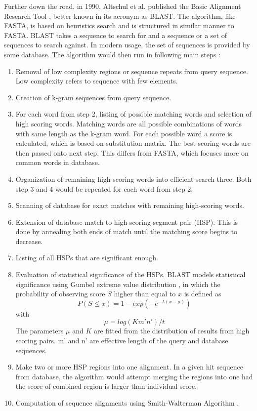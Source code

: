 Further down the road, in 1990, Altschul et al. published the Basic Alignment Research Tool \citep{Altschul90}, better known in its acronym as BLAST. The algorithm, like FASTA, is based on heuristics search and is structured in similar manner to FASTA. BLAST takes a sequence to search for and a sequence or a set of sequences to search against. In modern usage, the set of sequences is provided by some database. The algorithm would then run in following main steps \citep{mount2001bioinformatics}:

\begin{enumerate}
\item Removal of low complexity regions or sequence repeats from query sequence. Low complexity refers to sequence with few elements.
\item Creation of k-gram sequences from query sequence.
\item For each word from step 2, listing of possible matching words and selection of high scoring words. Matching words are all possible combinations of words with same length as the k-gram word. For each possible word a score is calculated, which is based on substitution matrix. The best scoring words are then passed onto next step. This differs from FASTA, which focuses more on common words in database.
\item Organization of remaining high scoring words into efficient search three. Both step 3 and 4 would be repeated for each word from step 2.
\item Scanning of database for exact matches with remaining high-scoring words.
\item Extension of database match to high-scoring-segment pair (HSP). This is done by annealing both ends of match until the matching score begins to decrease.
\item Listing of all HSPs that are significant enough.
\item Evaluation of statistical significance of the HSPs. BLAST models statistical significance using Gumbel extreme value distribution \citep{gumbel1954statistical}, in which the probability of observing score $S$ higher than equal to $x$ is defined as $$P(S \leq x) = 1 - exp(-e^{- \lambda (x - \mu)})$$ with $$\mu = log(Km'n')/t$$ The parameters $\mu$ and $K$ are fitted from the distribution of results from high scoring pairs. m' and n' are effective length of the query and database sequences.
\item Make two or more HSP regions into one alignment. In a given hit sequence from database, the algorithm would attempt merging the regions into one had the score of combined region is larger than individual score.
\item Computation of sequence alignments using Smith-Walterman Algorithm \citep{smith1981identification}.
\end{enumerate}

